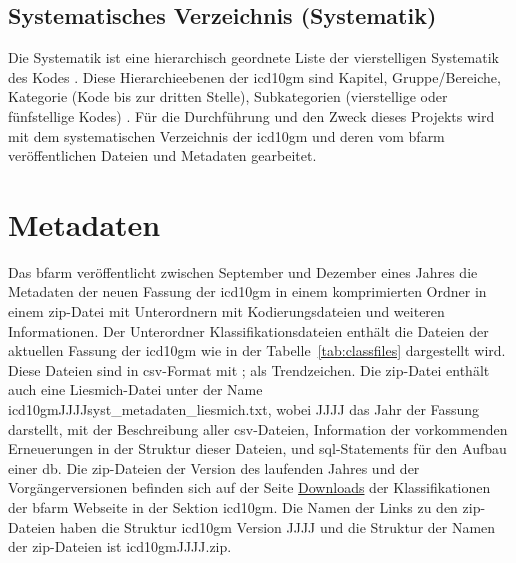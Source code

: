 \subsection{Systematisches Verzeichnis (Systematik)} \label{subsec:sistematic}

Die Systematik ist eine hierarchisch geordnete Liste der vierstelligen Systematik des Kodes \cite{icd10syst}. Diese Hierarchieebenen der \ac{icd10gm} sind Kapitel, Gruppe/Bereiche, Kategorie (Kode bis zur dritten Stelle), Subkategorien (vierstellige oder fünfstellige Kodes) \cite{icd10systauf}. Für die Durchführung und den Zweck dieses Projekts wird mit dem systematischen Verzeichnis der \ac{icd10gm} und deren vom \ac{bfarm} veröffentlichen Dateien und Metadaten gearbeitet.

\section{Metadaten} \label{sec:metadata}

Das \ac{bfarm} veröffentlicht zwischen September und Dezember eines Jahres die Metadaten der neuen Fassung der \ac{icd10gm} in einem komprimierten Ordner in einem \ac{zip}-Datei mit Unterordnern  mit Kodierungsdateien und weiteren Informationen. Der Unterordner Klassifikationsdateien enthält die Dateien der aktuellen Fassung der \ac{icd10gm} wie in der Tabelle~\ref{tab:classfiles} dargestellt wird. Diese Dateien sind in \ac{csv}-Format mit \glqq ;\grqq{} als Trendzeichen. Die \ac{zip}-Datei enthält auch eine Liesmich-Datei unter der Name \textsf{icd10gmJJJJsyst\_metadaten\_liesmich.txt}, wobei \textsf{JJJJ} das Jahr der Fassung darstellt, mit der Beschreibung aller \ac{csv}-Dateien, Information der vorkommenden Erneuerungen in der Struktur dieser Dateien, und \ac{sql}-Statements für den Aufbau einer \ac{db}. Die \ac{zip}-Dateien der Version des laufenden Jahres und der Vorgängerversionen befinden sich auf der Seite \href{https://www.dimdi.de/dynamic/de/klassifikationen/downloads/}{Downloads} der Klassifikationen der \ac{bfarm} Webseite in der Sektion \ac{icd10gm}. Die Namen der Links zu den \ac{zip}-Dateien haben die Struktur \textsf{\ac{icd10gm} Version JJJJ} und die Struktur der Namen der \ac{zip}-Dateien ist \textsf{\ac{icd10gm}JJJJ.zip}.

